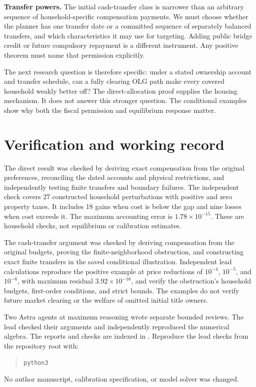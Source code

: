 \documentclass[11pt]{article}
\begin{document}
\textbf{Transfer powers.} The initial cash-transfer class is narrower than an
arbitrary sequence of household-specific compensation payments. We must choose
whether the planner has one transfer date or a committed sequence of separately
balanced transfers, and which characteristics it may use for targeting. Adding
public bridge credit or future compulsory repayment is a different instrument.
Any positive theorem must name that permission explicitly.

The next research question is therefore specific: under a stated ownership
account and transfer schedule, can a fully clearing OLG path make every covered
household weakly better off? The direct-allocation proof supplies the housing
mechanism. It does not answer this stronger question. The conditional examples
show why both the fiscal permission and equilibrium response matter.

\section{Verification and working record}

The direct result was checked by deriving exact compensation from the original
preferences, reconciling the dated accounts and physical restrictions, and
independently testing finite transfers and boundary failures. The independent
check covers 27 constructed household perturbations with positive and zero
property taxes. It includes 18 gains when cost is below the gap and nine losses
when cost exceeds it. The maximum accounting error is $1.78\times10^{-15}$.
These are household checks, not equilibrium or calibration estimates.

The cash-transfer argument was checked by deriving compensation from the
original budgets, proving the finite-neighborhood obstruction, and constructing
exact finite transfers in the saved conditional illustration. Independent lead
calculations reproduce the positive example at price reductions of $10^{-4}$,
$10^{-5}$, and $10^{-6}$, with maximum residual $3.92\times10^{-16}$, and verify
the obstruction's household budgets, first-order conditions, and strict bounds.
The examples do not verify future market clearing or the welfare of omitted
initial title owners.

Two Astra agents at maximum reasoning wrote separate bounded reviews. The lead
checked their arguments and independently reproduced the numerical algebra.
The reports and checks are indexed in
.
Reproduce the lead checks from the repository root with:
\begin{quote}\small
\texttt{python3}\ 
\end{quote}
No author manuscript, calibration specification, or model solver was changed.
\end{document}
